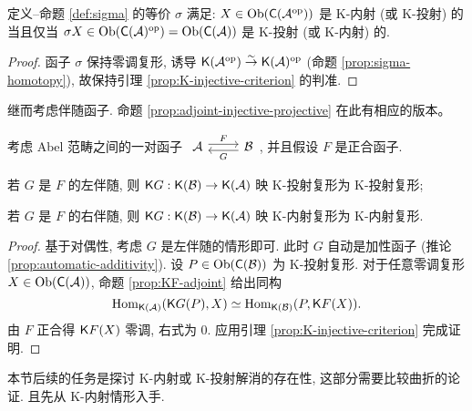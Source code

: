\begin{proposition}\label{prop:K-sigma-duality}
	定义--命题 \ref{def:sigma} 的等价 $\sigma$ 满足: $X \in \operatorname{Ob}(\mathsf{C}(\mathcal{A}^{\operatorname{op}}))$ 是 K-内射 (或 K-投射) 的当且仅当 $\sigma X \in \operatorname{Ob}(\mathsf{C}(\mathcal{A})^{\operatorname{op}}) = \operatorname{Ob}(\mathsf{C}(\mathcal{A}))$ 是 K-投射 (或 K-内射) 的.
\end{proposition}
\begin{proof}
	函子 $\sigma$ 保持零调复形, 诱导 $\mathsf{K}(\mathcal{A}^{\operatorname{op}}) \stackrel{\sim}{\rightarrow} \mathsf{K}(\mathcal{A})^{\operatorname{op}}$ (命题 \ref{prop:sigma-homotopy}), 故保持引理 \ref{prop:K-injective-criterion} 的判准.
\end{proof}

继而考虑伴随函子. 命题 \ref{prop:adjoint-injective-projective} 在此有相应的版本。

\begin{proposition}\label{prop:adjoint-injective-projectives-K}
	考虑 Abel 范畴之间的一对函子
	$\begin{tikzcd}
		\mathcal{A} \arrow[r, shift left, "F"] & \mathcal{B} \arrow[l, shift left, "G"]
	\end{tikzcd}$,
	并且假设 $F$ 是正合函子.
	\begin{compactitem}
		\item 若 $G$ 是 $F$ 的左伴随, 则 $\mathsf{K}G: \mathsf{K}(\mathcal{B}) \to \mathsf{K}(\mathcal{A})$ 映 K-投射复形为 K-投射复形;
		\item 若 $G$ 是 $F$ 的右伴随, 则 $\mathsf{K}G: \mathsf{K}(\mathcal{B}) \to \mathsf{K}(\mathcal{A})$ 映 K-内射复形为 K-内射复形.
	\end{compactitem}
\end{proposition}
\begin{proof}
	基于对偶性, 考虑 $G$ 是左伴随的情形即可. 此时 $G$ 自动是加性函子 (推论 \ref{prop:automatic-additivity}). 设 $P \in \operatorname{Ob}(\mathsf{C}(\mathcal{B}))$ 为 K-投射复形. 对于任意零调复形 $X \in \operatorname{Ob}(\mathsf{C}(\mathcal{A}))$, 命题 \ref{prop:KF-adjoint} 给出同构
	\[ \operatorname{Hom}_{\mathsf{K}(\mathcal{A})}(\mathsf{K}G(P), X) \simeq \operatorname{Hom}_{\mathsf{K}(\mathcal{B})}(P, \mathsf{K}F(X)). \]
	由 $F$ 正合得 $\mathsf{K}F(X)$ 零调, 右式为 $0$. 应用引理 \ref{prop:K-injective-criterion} 完成证明.
\end{proof}

本节后续的任务是探讨 K-内射或 K-投射解消的存在性, 这部分需要比较曲折的论证. 且先从 K-内射情形入手.

